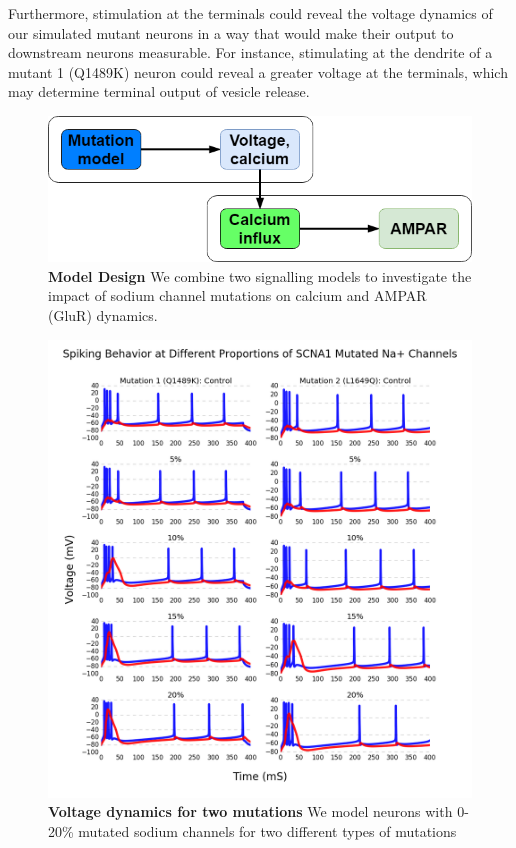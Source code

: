 Furthermore, stimulation at the terminals could reveal the
voltage dynamics of our simulated mutant neurons in a way that would make their output to downstream
neurons measurable. For instance, stimulating at the dendrite of a mutant 1 (Q1489K) neuron could
reveal a greater voltage at the terminals, which may determine terminal output of vesicle release.

\begin{figure}[!!h]
    \centering
    \includegraphics[width=\textwidth]{images/schematic.png}
    \caption{\textbf{Model Design} We combine two signalling models to investigate the impact of
    sodium channel mutations on calcium and AMPAR (GluR) dynamics.}
    \label{schematic}
\end{figure}

\begin{figure}[!!h]
    \centering
    \includegraphics[width=1\textwidth]{images/spikes_all.png}
    \caption{\textbf{Voltage dynamics for two mutations} We model neurons with 0-20\% mutated sodium
    channels for two different types of mutations}
    \label{fig:volt}
\end{figure}

